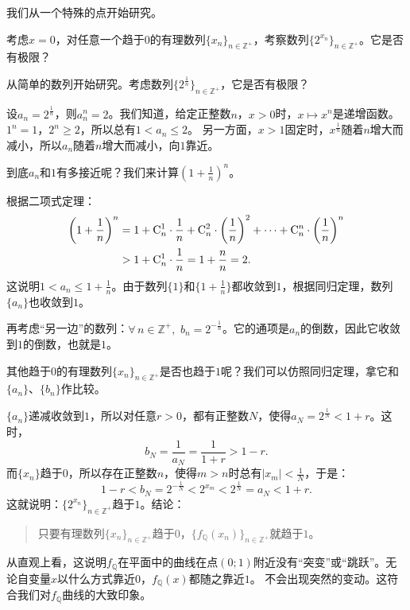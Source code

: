 \documentclass[12pt,UTF8,fontset=none]{ctexbook}
\begin{document}
我们从一个特殊的点开始研究。
\begin{et}
    考虑$x=0$，对任意一个趋于$0$的有理数列$\{x_n\}_{n\in\mathbb{Z}^+}$，考察数列$\{2^{x_n}\}_{n\in\mathbb{Z}^+}$。它是否有极限？
\end{et}
\begin{so}
    从简单的数列开始研究。考虑数列$\{2^\frac{1}{n}\}_{n\in\mathbb{Z}^+}$，它是否有极限？

    设$a_n = 2^\frac{1}{n}$，则$a_n^n = 2$。我们知道，给定正整数$n$，$x>0$时，$x\mapsto x^n$是递增函数。$1^n=1$，$2^n\geqslant 2$，所以总有$1<a_n\leqslant 2$。
    另一方面，$x>1$固定时，$x^\frac{1}{n}$随着$n$增大而减小，所以$a_n$随着$n$增大而减小，向$1$靠近。

    到底$a_n$和$1$有多接近呢？我们来计算$\left(1+\frac{1}{n}\right)^n$。

    根据二项式定理：
    \begin{align*}
        \left(1+\frac{1}{n}\right)^n &= 1 + \mathrm{C}_{n}^{1}\cdot \frac{1}{n} + \mathrm{C}_{n}^{2}\cdot \left(\frac{1}{n}\right)^2 + \cdots + \mathrm{C}_{n}^{n}\cdot \left(\frac{1}{n}\right)^n  \\
        &> 1 + \mathrm{C}_{n}^{1}\cdot \frac{1}{n} = 1 + \frac{n}{n} = 2. 
    \end{align*}
    这说明$1<a_n\leqslant 1 + \frac{1}{n}$。由于数列$\{1\}$和$\{1 + \frac{1}{n}\}$都收敛到$1$，根据同归定理，数列$\{a_n\}$也收敛到$1$。

    再考虑“另一边”的数列：$\forall \, n\in\mathbb{Z}^+,\,\, b_n = 2^{-\frac{1}{n}}$。它的通项是$a_n$的倒数，因此它收敛到$1$的倒数，也就是$1$。

    其他趋于$0$的有理数列$\{x_n\}_{n\in\mathbb{Z}^+}$是否也趋于$1$呢？我们可以仿照同归定理，拿它和$\{a_n\}$、$\{b_n\}$作比较。

    $\{a_n\}$递减收敛到$1$，所以对任意$r>0$，都有正整数$N$，使得$a_{N} = 2^{\frac{1}{N}} < 1 + r$。这时，
    $$b_N = \frac{1}{a_N} = \frac{1}{1 + r} > 1 - r.$$
    而$\{x_n\}$趋于$0$，所以存在正整数$n$，使得$m>n$时总有$|x_m| < \frac{1}{N}$，于是：
    $$1 - r < b_N = 2^{-\frac{1}{N}} < 2^{x_m} < 2^\frac{1}{N} = a_N < 1 + r.$$
    这就说明：$\{2^{x_n}\}_{n\in\mathbb{Z}^+}$趋于$1$。结论：
    \begin{quotation}
        只要有理数列$\{x_n\}_{n\in\mathbb{Z}^+}$趋于$0$，$\{f_{\mathbb{Q}}(x_n)\}_{n\in\mathbb{Z}^+}$就趋于$1$。
    \end{quotation}
\end{so}

从直观上看，这说明$f_{\mathbb{Q}}$在平面中的曲线在点$(0;1)$附近没有“突变”或“跳跃”。无论自变量$x$以什么方式靠近$0$，$f_{\mathbb{Q}}(x)$都随之靠近$1$。
不会出现突然的变动。这符合我们对$f_{\mathbb{Q}}$曲线的大致印象。
\end{document}
